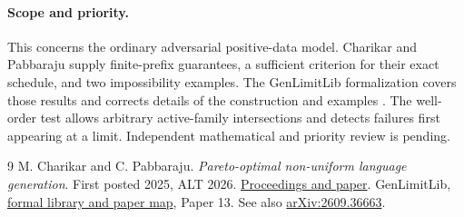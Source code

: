 \documentclass[11pt]{article}
\begin{document}
\paragraph{Scope and priority.} This concerns the ordinary adversarial positive-data model. Charikar and Pabbaraju supply finite-prefix guarantees, a sufficient criterion for their exact schedule, and two impossibility examples. The GenLimitLib formalization covers those results and corrects details of the construction and examples \cite{formal}. The well-order test allows arbitrary active-family intersections and detects failures first appearing at a limit. Independent mathematical and priority review is pending.
\begin{thebibliography}{9}
 M. Charikar and C. Pabbaraju. \emph{Pareto-optimal non-uniform language generation}. First posted 2025, ALT 2026. \href{https://proceedings.mlr.press/v313/charikar26a.html}{Proceedings and paper}.
 GenLimitLib, \href{https://github.com/pengzhang91/generation-in-the-limit-lib}{formal library and paper map}, Paper 13. See also \href{https://arxiv.org/abs/2609.36663}{arXiv:2609.36663}.
\end{thebibliography}
\end{document}
